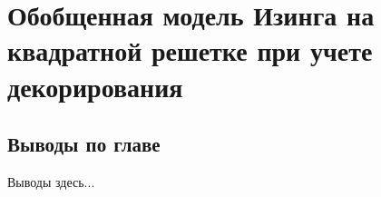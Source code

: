 \chapter{Обобщенная модель Изинга на квадратной решетке при учете декорирования}\label{ch:ch6}


\section{Выводы по главе}

Выводы здесь...


\FloatBarrier
